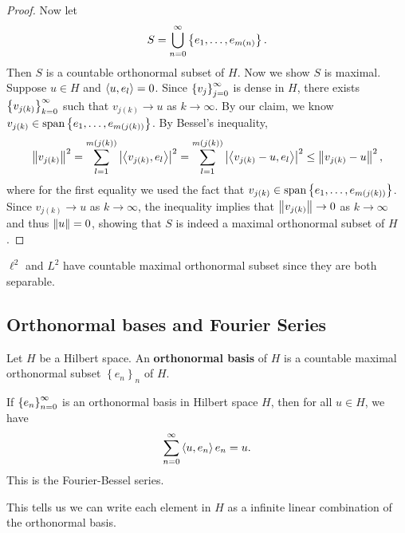 \documentclass[a4paper]{article}
\begin{document}
\begin{proof}
Now let 
\[
S = \bigcup_{n=0}^\infty \left\{ e_1, \dots, e_{m(n)} \right\}.
\]
Then $S$ is a countable orthonormal subset of $H$.
Now we show $S$ is maximal. Suppose $u \in H$ and 
$\left\langle u, e_l \right\rangle = 0$. Since $\left\{ v_j \right\}_{j=0}^\infty$ is dense in 
$H$, there exists $\left\{ v_{j(k)} \right\}_{k=0}^\infty$ such that 
$v_{j(k)} \to u$ as $k \to \infty$. 
By our claim, we know 
$v_{j(k)} \in \operatorname{span} \left\{ e_1, \dots, e_{m(j(k))} \right\}$.
By Bessel's inequality, 
\[
\begin{aligned}
\left\lVert v_{j(k)}\right\rVert^2 
= \sum_{l=1}^{m(j(k))} \left\lvert \left\langle v_{j(k)}, e_l \right\rangle\right\rvert^2 
= \sum_{l=1}^{m(j(k))} \left\lvert \left\langle v_{j(k)} - u, e_l \right\rangle\right\rvert^2 
\leq \left\lVert v_{j(k)} - u\right\rVert^2,
\end{aligned}
\]
where for the first equality we used the fact that 
$v_{j(k)} \in \operatorname{span} \left\{ e_1, \dots, e_{m(j(k))} \right\}$.
Since $v_{j(k)} \to u$ as $k \to \infty$, 
the inequality implies that
$\left\lVert v_{j(k)}\right\rVert \to 0$ as $k \to \infty$ 
and thus $\left\lVert u\right\rVert = 0$, showing that 
$S$ is indeed a maximal orthonormal subset 
of $H$.
\end{proof}

\begin{cor}
$\ell^2$ and $L^2$ have countable maximal orthonormal
subset since they are both separable.
\end{cor}

\subsection{Orthonormal bases and Fourier Series}

\begin{defi}
Let $H$ be a Hilbert space. An \textbf{orthonormal basis}
of $H$ is a countable maximal orthonormal subset 
$\left\{ e_n \right\}_n$ of $H$.
\end{defi}

\begin{thm}
If $\left\{ e_n \right\}_{n=0}^\infty$ is an orthonormal basis in 
Hilbert space $H$, then for all $u \in H$, we have 
\[
\sum_{n=0}^\infty \left\langle u, e_n \right\rangle e_n = u.
\]
This is the Fourier-Bessel series.

This tells us we can write each element in $H$ as a 
infinite linear combination of the orthonormal basis.
\end{thm}
\end{document}

